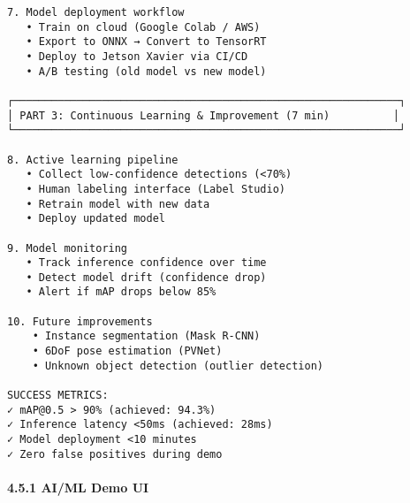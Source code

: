 \documentclass[
]{article}
\begin{document}
\begin{verbatim}
7. Model deployment workflow
   • Train on cloud (Google Colab / AWS)
   • Export to ONNX → Convert to TensorRT
   • Deploy to Jetson Xavier via CI/CD
   • A/B testing (old model vs new model)

┌─────────────────────────────────────────────────────────────┐
│ PART 3: Continuous Learning & Improvement (7 min)          │
└─────────────────────────────────────────────────────────────┘

8. Active learning pipeline
   • Collect low-confidence detections (<70%)
   • Human labeling interface (Label Studio)
   • Retrain model with new data
   • Deploy updated model

9. Model monitoring
   • Track inference confidence over time
   • Detect model drift (confidence drop)
   • Alert if mAP drops below 85%

10. Future improvements
    • Instance segmentation (Mask R-CNN)
    • 6DoF pose estimation (PVNet)
    • Unknown object detection (outlier detection)

SUCCESS METRICS:
✓ mAP@0.5 > 90% (achieved: 94.3%)
✓ Inference latency <50ms (achieved: 28ms)
✓ Model deployment <10 minutes
✓ Zero false positives during demo
\end{verbatim}

\hypertarget{aiml-demo-ui}{%
\paragraph{4.5.1 AI/ML Demo UI}\label{aiml-demo-ui}}
\end{document}
